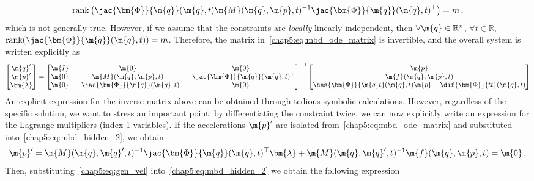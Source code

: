 %
\begin{equation}
  \mathrm{rank}\left( \jac{\bm{\Phi}}{\m{q}}(\m{q}, t) \m{M}(\m{q}, \m{p}, t)^{-1} \jac{\bm{\Phi}}{\m{q}}(\m{q}, t)^{\top}\right) = m \, \text{,}
  \label{chap5:eq:compression}
\end{equation}
%
which is not generally true. However, if we assume that the constraints are \emph{locally} linearly independent, then $\forall\m{q}\in\mathbb{R}^{n}$, $\forall t \in \mathbb{R}$, $\mathrm{rank}(\jac{\bm{\Phi}}{\m{q}}(\m{q}, t)) = m$. Therefore, the matrix in~\eqref{chap5:eq:mbd_ode_matrix} is invertible, and the overall system is written explicitly as
%
\begin{equation*}
  \begin{bmatrix}
    \m{q}^{\prime} \\ \m{p}^{\prime} \\ \bm{\lambda}
  \end{bmatrix} = \begin{bmatrix}
    \m{I} & \m{0} & \m{0} \\
    \m{0} & \m{M}(\m{q}, \m{p}, t) & -\jac{\bm{\Phi}}{\m{q}}(\m{q}, t)^{\top} \\
    \m{0} & -\jac{\bm{\Phi}}{\m{q}}(\m{q}, t) & \m{0}
  \end{bmatrix}^{-1}
  \begin{bmatrix}
    \m{p} \\
    \m{f}(\m{q},\m{p},t) \\
    \hes{\bm{\Phi}}{\m{q}t}(\m{q}, t)\m{p} + \dif{\bm{\Phi}}{tt}(\m{q}, t)
  \end{bmatrix}
\end{equation*}
%
An explicit expression for the inverse matrix above can be obtained through tedious symbolic calculations. However, regardless of the specific solution, we want to stress an important point: by differentiating the constraint twice, we can now explicitly write an expression for the Lagrange multipliers (index-1 variables). If the accelerations $\m{p}^{\prime}$ are isolated from~\eqref{chap5:eq:mbd_ode_matrix} and substituted into~\eqref{chap5:eq:mbd_hidden_2}, we obtain
%
\begin{equation}
  \m{p}^{\prime} = \m{M}(\m{q}, \m{q}^{\prime}, t)^{-1} \jac{\bm{\Phi}}{\m{q}}(\m{q}, t)^{\top}\bm{\lambda} + \m{M}(\m{q}, \m{q}^{\prime}, t)^{-1}\m{f}(\m{q},\m{p},t) = \m{0} \, \text{.}
  \label{chap5:eq:gen_vel}
\end{equation}
%
Then, substituting~\eqref{chap5:eq:gen_vel} into~\eqref{chap5:eq:mbd_hidden_2} we obtain the following expression
